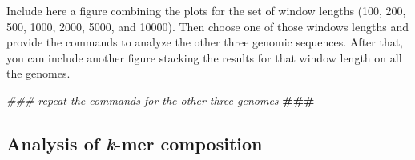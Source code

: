 \documentclass[10pt,a4paper,]{article}
\newenvironment{Shaded}{}{}
\newcommand{\AlertTok}[1]{\textcolor[rgb]{1.00,0.00,0.00}{\textbf{#1}}}
\newcommand{\CommentTok}[1]{\textcolor[rgb]{0.38,0.63,0.69}{\textit{#1}}}
\newcommand{\DataTypeTok}[1]{\textcolor[rgb]{0.56,0.13,0.00}{#1}}
\newcommand{\DecValTok}[1]{\textcolor[rgb]{0.25,0.63,0.44}{#1}}
\newcommand{\FloatTok}[1]{\textcolor[rgb]{0.25,0.63,0.44}{#1}}
\newcommand{\KeywordTok}[1]{\textcolor[rgb]{0.00,0.44,0.13}{\textbf{#1}}}
\newcommand{\NormalTok}[1]{#1}
\newcommand{\OperatorTok}[1]{\textcolor[rgb]{0.40,0.40,0.40}{#1}}
\newcommand{\StringTok}[1]{\textcolor[rgb]{0.25,0.44,0.63}{#1}}
\begin{document}
\begin{Shaded}
\end{Shaded}

Include here a figure combining the plots for the set of window lengths
(100, 200, 500, 1000, 2000, 5000, and 10000). Then choose one of those
windows lengths and provide the commands to analyze the other three
genomic sequences. After that, you can include another figure stacking
the results for that window length on all the genomes.

\begin{Shaded}
\begin{Highlighting}[]
\CommentTok{### repeat the commands for the other three genomes }\AlertTok{###}
\end{Highlighting}
\end{Shaded}

\hypertarget{analysis-of-k-mer-composition}{%
\subsection{\texorpdfstring{Analysis of \emph{k}-mer
composition}{Analysis of k-mer composition}}\label{analysis-of-k-mer-composition}}
\end{document}
